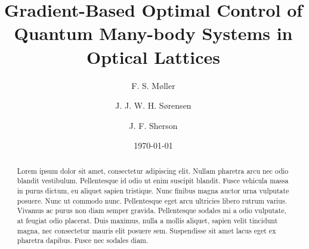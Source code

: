 \documentclass[%
 reprint,
 amsmath,amssymb,
 aps,
pra,
]{revtex4-1}
\begin{document}

\title{Gradient-Based Optimal Control of Quantum Many-body Systems in Optical Lattices}%

\author{F. S. M\o ller}
\author{J. J. W. H. S\o rensen}
\author{J. F. Sherson}
\date{\today}%

\begin{abstract}
Lorem ipsum dolor sit amet, consectetur adipiscing elit. Nullam pharetra arcu nec odio blandit vestibulum. Pellentesque id odio ut enim suscipit blandit. Fusce vehicula massa in purus dictum, eu aliquet sapien tristique. Nunc finibus magna auctor urna vulputate posuere. Nunc ut commodo nunc. Pellentesque eget arcu ultricies libero rutrum varius. Vivamus ac purus non diam semper gravida. Pellentesque sodales mi a odio vulputate, at feugiat odio placerat. Duis maximus, nulla a mollis aliquet, sapien velit tincidunt magna, nec consectetur mauris elit posuere sem. Suspendisse sit amet lacus eget ex pharetra dapibus. Fusce nec sodales diam.

\end{abstract}

\maketitle






%


%

\end{document}
